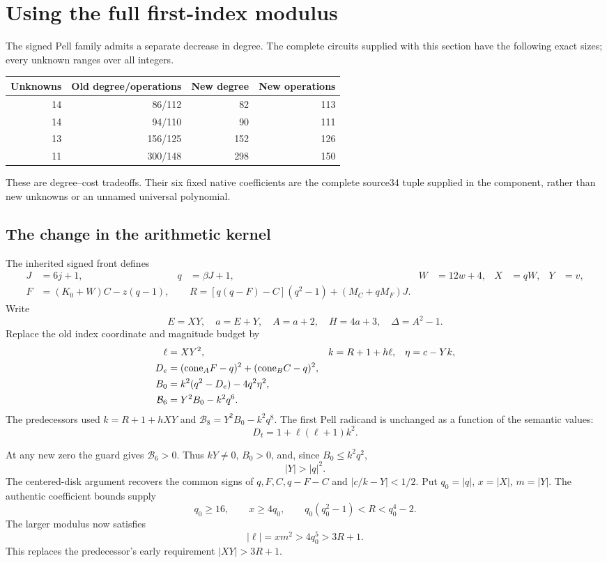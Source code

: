 \section{Using the full first-index modulus}
\label{sec:indexmodulus}

The signed Pell family admits a separate decrease in degree. The complete
circuits supplied with this section have the following exact sizes; every
unknown ranges over all integers.
\begin{center}
\begin{tabular}{rrrr}
Unknowns&Old degree/operations&New degree&New operations\\\hline
14&86/112&82&113\\
14&94/110&90&111\\
13&156/125&152&126\\
11&300/148&298&150
\end{tabular}
\end{center}
These are degree--cost tradeoffs. Their six fixed native coefficients are
the complete source34 tuple supplied in the component, rather than new
unknowns or an unnamed universal polynomial.

\subsection{The change in the arithmetic kernel}
The inherited signed front defines
\begin{align*}
 J&=6j+1,&q&=\beta J+1,&W&=12w+4,&X&=qW,&Y&=v,\\
 F&=(K_0+W)C-z(q-1),&&
 R=[q(q-F)-C](q^2-1)+(M_C+qM_F)J.
\end{align*}
Write
\[
 E=XY,\quad a=E+Y,\quad A=a+2,\quad H=4a+3,
 \quad \Delta=A^2-1.
\]
Replace the old index coordinate and magnitude budget by
\begin{align}
 \ell&=XY^2,&k&=R+1+h\ell,&\eta&=c-Yk,\label{eq:rebasedk}\\
 D_e&=(\mathrm{cone}_A F-q)^2+(\mathrm{cone}_B C-q)^2,&&&\notag\\
 B_0&=k^2(q^2-D_e)-4q^2\eta^2,&&&\notag\\
 \mathcal B_6&=Y^2B_0-k^2q^6.&&&\label{eq:rebasebudget}
\end{align}
The predecessors used $k=R+1+hXY$ and
$\mathcal B_8=Y^2B_0-k^2q^8$. The first Pell radicand is unchanged
as a function of the semantic values:
\[
 D_t=1+\ell(\ell+1)k^2.
\]

At any new zero the guard gives $\mathcal B_6>0$. Thus $kY\ne0$,
$B_0>0$, and, since $B_0\le k^2q^2$,
\begin{equation}\label{eq:rebasemagnitude}
 |Y|>|q|^2.
\end{equation}
The centered-disk argument recovers the common signs of $q,F,C,q-F-C$
and $|c/k-Y|<1/2$. Put $q_0=|q|$, $x=|X|$, $m=|Y|$.
The authentic coefficient bounds supply
\[
 q_0\ge16,\qquad x\ge4q_0,\qquad
 q_0(q_0^2-1)<R<q_0^4-2.
\]
The larger modulus now satisfies
\begin{equation}\label{eq:rebasedmodulus}
 |\ell|=xm^2>4q_0^5>3R+1.
\end{equation}
This replaces the predecessor's early requirement $|XY|>3R+1$.

